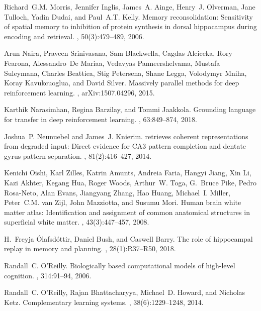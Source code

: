 \documentclass[letterpaper,11pt]{article}
\begin{document}
\begin{thebibliography}{100}
Richard~G.M. Morris, Jennifer Inglis, James~A. Ainge, Henry~J. Olverman, Jane
  Tulloch, Yadin Dudai, and Paul~A.T. Kelly.
\newblock Memory reconsolidation: Sensitivity of spatial memory to inhibition
  of protein synthesis in dorsal hippocampus during encoding and retrieval.
, 50(3):479--489, 2006.

Arun Naira, Praveen Srinivasana, Sam Blackwella, Cagdas Alciceka, Rory Fearona,
  Alessandro~De Mariaa, Vedavyas Panneershelvama, Mustafa Suleymana, Charles
  Beattiea, Stig Petersena, Shane Legga, Volodymyr Mniha, Koray Kavukcuoglua,
  and David Silver.
\newblock Massively parallel methods for deep reinforcement learning.
, arXiv:1507.04296, 2015.

Karthik Narasimhan, Regina Barzilay, and Tommi Jaakkola.
\newblock Grounding language for transfer in deep reinforcement learning.
, 63:849--874, 2018.

Joshua~P. Neunuebel and James~J. Knierim.
 retrieves coherent representations from degraded input: Direct
  evidence for {CA3} pattern completion and dentate gyrus pattern separation.
, 81(2):416--427, 2014.

Kenichi Oishi, Karl Zilles, Katrin Amunts, Andreia Faria, Hangyi Jiang, Xin Li,
  Kazi Akhter, Kegang Hua, Roger Woods, Arthur~W. Toga, G.~Bruce Pike, Pedro
  Rosa-Neto, Alan Evans, Jiangyang Zhang, Hao Huang, Michael~I. Miller,
  Peter~C.M. van Zijl, John Mazziotta, and Susumu Mori.
\newblock Human brain white matter atlas: Identification and assignment of
  common anatomical structures in superficial white matter.
, 43(3):447--457, 2008.

H.~Freyja \'{O}lafsd\'{o}ttir, Daniel Bush, and Caswell Barry.
\newblock The role of hippocampal replay in memory and planning.
, 28(1):R37--R50, 2018.

Randall~C. O'Reilly.
\newblock Biologically based computational models of high-level cognition.
, 314:91--94, 2006.

Randall~C. O'Reilly, Rajan Bhattacharyya, Michael~D. Howard, and Nicholas Ketz.
\newblock Complementary learning systems.
, 38(6):1229--1248, 2014.


\end{thebibliography}
\end{document}
